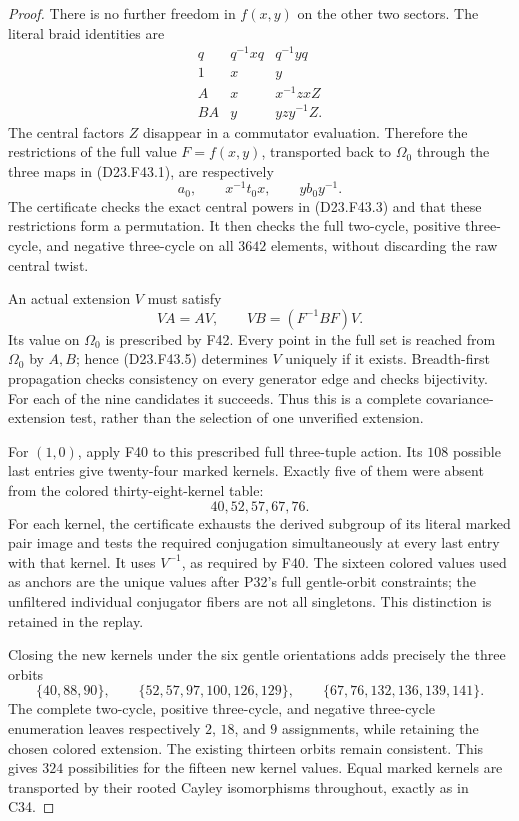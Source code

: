 \begin{proof}
There is no further freedom in $f(x,y)$ on the other
two sectors. The literal braid identities are
\[
 \begin{array}{c|cc}
 q&q^{-1}xq&q^{-1}yq\\ \hline
 1&x&y\\
 A&x&x^{-1}zxZ\\
 BA&y&yzy^{-1}Z.
 \end{array}
                                                        \tag{D23.F43.3}
\]
The central factors $Z$ disappear in a commutator
evaluation. Therefore the restrictions of the full value
$F=f(x,y)$, transported back to $\Omega_0$ through the
three maps in (D23.F43.1), are respectively
\[
                   a_0,\qquad x^{-1}t_0x,
                            \qquad yb_0y^{-1}.
                                                        \tag{D23.F43.4}
\]
The certificate checks the exact central powers in
(D23.F43.3) and that these restrictions form a permutation.
It then checks the full two-cycle, positive three-cycle,
and negative three-cycle on all $3642$ elements, without
discarding the raw central twist.

An actual extension $V$ must satisfy
\[
               VA=AV,\qquad VB=(F^{-1}BF)V.
                                                        \tag{D23.F43.5}
\]
Its value on $\Omega_0$ is prescribed by F42. Every point
in the full set is reached from $\Omega_0$ by $A,B$;
hence (D23.F43.5) determines $V$ uniquely if it exists.
Breadth-first propagation checks consistency on every
generator edge and checks bijectivity. For each of the
nine candidates it succeeds. Thus this is a complete
covariance-extension test, rather than the selection of
one unverified extension.

For $(1,0)$, apply F40 to this prescribed full three-tuple
action. Its $108$ possible last entries give twenty-four
marked kernels. Exactly five of them were absent from
the colored thirty-eight-kernel table:
\[
                             40,52,57,67,76.
\]
For each kernel, the certificate exhausts the derived
subgroup of its literal marked pair image and tests the
required conjugation simultaneously at every last entry
with that kernel. It uses $V^{-1}$, as required by F40.
The sixteen colored values used as anchors are the unique
values after P32's full gentle-orbit constraints; the
unfiltered individual conjugator fibers are not all
singletons. This distinction is retained in the replay.

Closing the new kernels under the six gentle orientations
adds precisely the three orbits
\[
 \{40,88,90\},\qquad
 \{52,57,97,100,126,129\},\qquad
 \{67,76,132,136,139,141\}.
                                                        \tag{D23.F43.6}
\]
The complete two-cycle, positive three-cycle, and negative
three-cycle enumeration leaves respectively $2$, $18$,
and $9$ assignments, while retaining the chosen colored
extension. The existing thirteen orbits remain consistent.
This gives $324$ possibilities for the fifteen new kernel
values. Equal marked kernels are transported by their
rooted Cayley isomorphisms throughout, exactly as in C34.


\end{proof}
